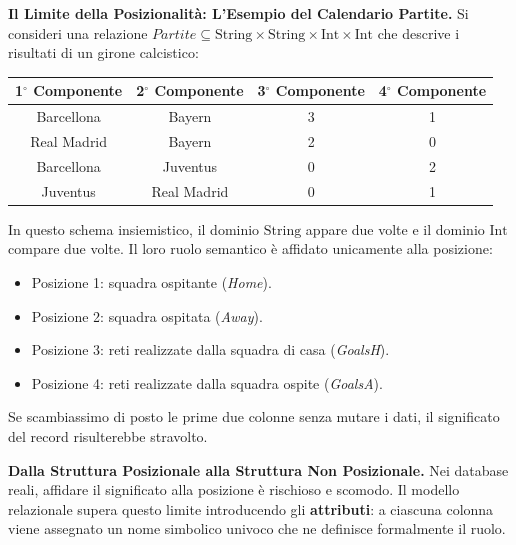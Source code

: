 \documentclass[12pt]{extarticle}
\begin{document}
\medskip
\noindent \textbf{Il Limite della Posizionalità: L'Esempio del Calendario Partite.} Si consideri una relazione $Partite \subseteq \text{String} \times \text{String} \times \text{Int} \times \text{Int}$ che descrive i risultati di un girone calcistico:
\begin{center}
\small
\begin{tabular}{cccc}
    \toprule
    \textbf{1$^\circ$ Componente} & \textbf{2$^\circ$ Componente} & \textbf{3$^\circ$ Componente} & \textbf{4$^\circ$ Componente} \\
    \midrule
    Barcellona & Bayern & 3 & 1 \\
    Real Madrid & Bayern & 2 & 0 \\
    Barcellona & Juventus & 0 & 2 \\
    Juventus & Real Madrid & 0 & 1 \\
    \bottomrule
\end{tabular}
\end{center}
In questo schema insiemistico, il dominio $\text{String}$ appare due volte e il dominio $\text{Int}$ compare due volte. Il loro ruolo semantico è affidato unicamente alla posizione:
\begin{itemize}
    \item Posizione 1: squadra ospitante (\textit{Home}).
    \item Posizione 2: squadra ospitata (\textit{Away}).
    \item Posizione 3: reti realizzate dalla squadra di casa (\textit{GoalsH}).
    \item Posizione 4: reti realizzate dalla squadra ospite (\textit{GoalsA}).
\end{itemize}
Se scambiassimo di posto le prime due colonne senza mutare i dati, il significato del record risulterebbe stravolto.

\medskip
\noindent \textbf{Dalla Struttura Posizionale alla Struttura Non Posizionale.} Nei database reali, affidare il significato alla posizione è rischioso e scomodo. Il modello relazionale supera questo limite introducendo gli \textbf{attributi}: a ciascuna colonna viene assegnato un nome simbolico univoco che ne definisce formalmente il ruolo.
\end{document}
